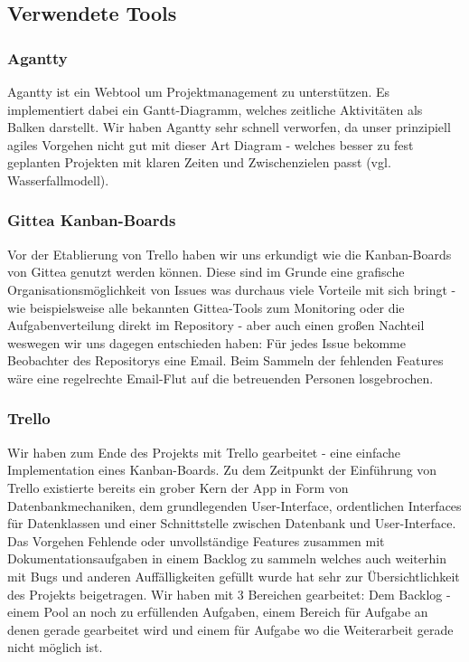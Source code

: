 \subsection{Verwendete Tools}
\subsubsection*{Agantty}
Agantty ist ein Webtool um Projektmanagement zu unterstützen. Es implementiert dabei ein Gantt-Diagramm, welches zeitliche Aktivitäten als Balken darstellt. Wir haben Agantty sehr schnell verworfen, da unser prinzipiell agiles Vorgehen nicht gut mit dieser Art Diagram - welches besser zu fest geplanten Projekten mit klaren Zeiten und Zwischenzielen passt (vgl. Wasserfallmodell).

\subsubsection*{Gittea Kanban-Boards}
Vor der Etablierung von Trello haben wir uns erkundigt wie die Kanban-Boards von Gittea genutzt werden können. Diese sind im Grunde eine grafische Organisationsmöglichkeit von Issues was durchaus viele Vorteile mit sich bringt - wie beispielsweise alle bekannten Gittea-Tools zum Monitoring oder die Aufgabenverteilung direkt im Repository - aber auch einen großen Nachteil weswegen wir uns dagegen entschieden haben: Für jedes Issue bekomme Beobachter des Repositorys eine Email. Beim Sammeln der fehlenden Features wäre eine regelrechte Email-Flut auf die betreuenden Personen losgebrochen.

\subsubsection*{Trello}
Wir haben zum Ende des Projekts mit Trello gearbeitet - eine einfache Implementation eines Kanban-Boards. Zu dem Zeitpunkt der Einführung von Trello existierte bereits ein grober Kern der App in Form von Datenbankmechaniken, dem grundlegenden User-Interface, ordentlichen Interfaces für Datenklassen und einer Schnittstelle zwischen Datenbank und User-Interface. Das Vorgehen Fehlende oder unvollständige Features zusammen mit Dokumentationsaufgaben in einem Backlog zu sammeln welches auch weiterhin mit Bugs und anderen Auffälligkeiten gefüllt wurde hat sehr zur Übersichtlichkeit des Projekts beigetragen. Wir haben mit 3 Bereichen gearbeitet: Dem Backlog - einem Pool an noch zu erfüllenden Aufgaben, einem Bereich für Aufgabe an denen gerade gearbeitet wird und einem für Aufgabe wo die Weiterarbeit gerade nicht möglich ist. 

